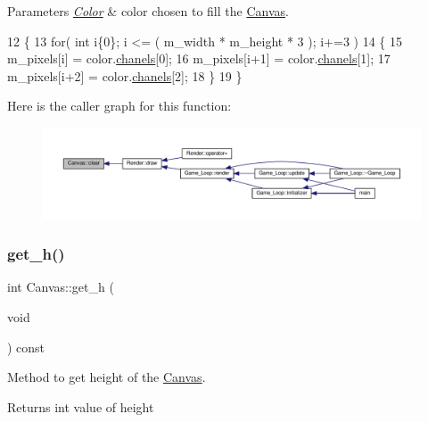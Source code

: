 \begin{DoxyParams}{Parameters}
{\em \hyperlink{structColor}{Color}} & color chosen to fill the \hyperlink{classCanvas}{Canvas}. \\
\hline
\end{DoxyParams}

\begin{DoxyCode}
12 \{
13     \textcolor{keywordflow}{for}( \textcolor{keywordtype}{int} i\{0\}; i <= ( m\_width * m\_height * 3 ); i+=3 )
14     \{
15         m\_pixels[i] = color.\hyperlink{structColor_ada1526285d388ff4b13e1af8d7e3ad44}{chanels}[0];
16         m\_pixels[i+1] = color.\hyperlink{structColor_ada1526285d388ff4b13e1af8d7e3ad44}{chanels}[1];
17         m\_pixels[i+2] = color.\hyperlink{structColor_ada1526285d388ff4b13e1af8d7e3ad44}{chanels}[2];
18     \}
19 \}
\end{DoxyCode}
Here is the caller graph for this function\+:\nopagebreak
\begin{figure}[H]
\begin{center}
\leavevmode
\includegraphics[width=350pt]{classCanvas_a0205269b201aed71f21b8f613cd66333_icgraph}
\end{center}
\end{figure}
\mbox{\label{classCanvas_ab26c7ab91a0a9069895285a314bc8418}} 
\subsubsection{\texorpdfstring{get\+\_\+h()}{get\_h()}}
{\footnotesize\ttfamily int Canvas\+::get\+\_\+h (\begin{DoxyParamCaption}\item[{void}]{ }\end{DoxyParamCaption}) const}



Method to get height of the \hyperlink{classCanvas}{Canvas}. 

\begin{DoxyReturn}{Returns}
int value of height 
\end{DoxyReturn}

